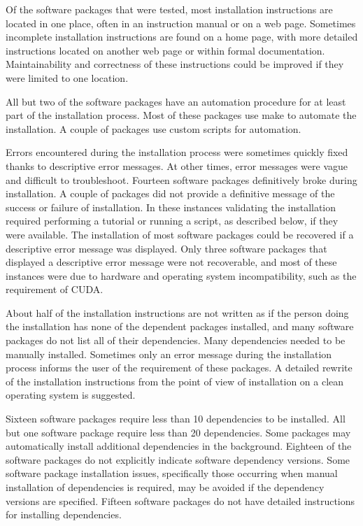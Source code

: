 \documentclass[12pt, notitlepage]{article}
\begin{document}
Of the software packages that were tested, most installation instructions are located in one place, often in an instruction manual or on a web page. Sometimes incomplete installation instructions are found on a home page, with more detailed instructions located on another web page or within formal documentation. Maintainability and correctness of these instructions could be improved if they were limited to one location. 

All but two of the software packages have an automation procedure for at least part of the installation process. Most of these packages use make to automate the installation. A couple of packages use custom scripts for automation.

Errors encountered during the installation process were sometimes quickly fixed thanks to descriptive error messages. At other times, error messages were vague and difficult to troubleshoot. Fourteen software packages definitively broke during installation. A couple of packages did not provide a definitive message of the success or failure of installation. In these instances validating the installation required performing a tutorial or running a script, as described below, if they were available. The installation of most software packages could be recovered if a descriptive error message was displayed. Only three software packages that displayed a descriptive error message were not recoverable, and most of these instances were due to hardware and operating system incompatibility, such as the requirement of CUDA.

About half of the installation instructions are not written as if the person doing the installation has none of the dependent packages installed, and many software packages do not list all of their dependencies. Many dependencies needed to be manually installed. Sometimes only an error message during the installation process informs the user of the requirement of these packages. A detailed rewrite of the installation instructions from the point of view of installation on a clean operating system is suggested.

Sixteen software packages require less than 10 dependencies to be installed. All but one software package require less than 20 dependencies. Some packages may automatically install additional dependencies in the background. Eighteen of the software packages do not explicitly indicate software dependency versions. Some software package installation issues, specifically those occurring when manual installation of dependencies is required, may be avoided if the dependency versions are specified. Fifteen software packages do not have detailed instructions for installing dependencies. 
\end{document}
